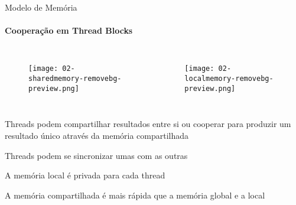 \begin{frame}[t]{Modelo de Memória}
    \framesubtitle{Cooperação em Thread Blocks}
    \begin{columns}
            \begin{figure}
               \texttt{[image: 02-sharedmemory-removebg-preview.png]}
            \end{figure}
        
            \begin{figure}
               \texttt{[image: 02-localmemory-removebg-preview.png]}
            \end{figure}
    \end{columns}
    \vspace*{0.2cm}
    \itemize
    \item Threads podem compartilhar resultados entre si ou cooperar para produzir um resultado único através da memória compartilhada
    \item Threads podem se sincronizar umas com as outras
    \item A memória local é privada para cada thread
    \item A memória compartilhada é mais rápida que a memória global e a local

\end{frame}
